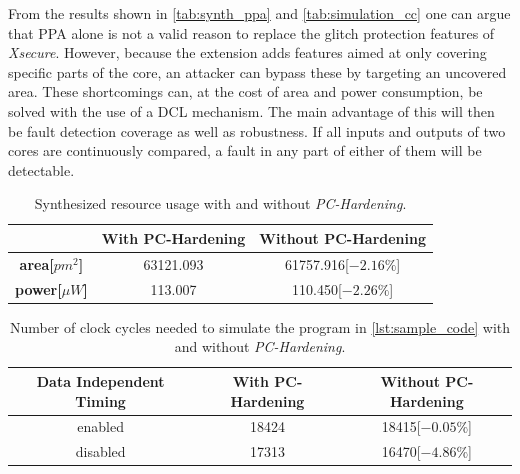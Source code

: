 From the results shown in \autoref{tab:synth_ppa} and \autoref{tab:simulation_cc} one can argue that PPA alone is not a valid reason to replace the glitch protection features of \textit{Xsecure}. However, because the extension adds features aimed at only covering specific parts of the core, an attacker can bypass these by targeting an uncovered area. These shortcomings can, at the cost of area and power consumption, be solved with the use of a DCL mechanism. The main advantage of this will then be fault detection coverage as well as robustness. If all inputs and outputs of two cores are continuously compared, a fault in any part of either of them will be detectable.  

\begin{table}[h]
\centering
\caption{Synthesized resource usage with and without \textit{PC-Hardening}.}
\label{tab:synth_ppa}
\begin{tabular}{ccc}
\toprule 
& With PC-Hardening & Without PC-Hardening \\
\midrule
\rowcolor{black!20} \textbf{area[$pm^2$]} & 63121.093 & 61757.916[$-2.16\%$] \\
\textbf{power[$\mu W$]} & 113.007 & 110.450[$-2.26\%$] \\
\bottomrule
\end{tabular}
\end{table}

\begin{table}[h]
\centering
\caption{Number of clock cycles needed to simulate the program in \autoref{lst:sample_code} with and without \textit{PC-Hardening}.}
\label{tab:simulation_cc}
\begin{tabular}{c|cc}
\toprule 
Data Independent Timing & With PC-Hardening & Without PC-Hardening \\
\midrule
\rowcolor{black!20} enabled & 18424 & 18415[$-0.05\%$] \\
disabled & 17313 & 16470[$-4.86\%$] \\
\bottomrule
\end{tabular}
\end{table}




